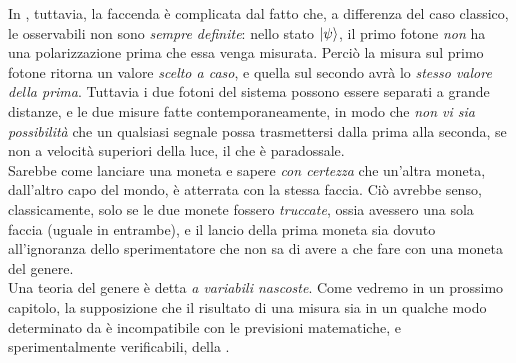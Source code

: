 \documentclass[../../FisicaTeorica.tex]{subfiles}
\begin{document}
\begin{oss}
In \MQ, tuttavia, la faccenda è complicata dal fatto che, a differenza del caso classico, le osservabili non sono \textit{sempre definite}: nello stato $\ket{\psi}$, il primo fotone \textit{non} ha una polarizzazione  prima che essa venga misurata. Perciò la misura sul primo fotone ritorna un valore \textit{scelto a caso}, e quella sul secondo avrà lo \textit{stesso valore della prima}. Tuttavia i due fotoni del sistema possono essere separati a grande distanze, e le due misure fatte contemporaneamente, in modo che \textit{non vi sia possibilità} che un qualsiasi segnale possa trasmettersi dalla prima alla seconda, se non a velocità superiori della luce, il che è paradossale.\\
Sarebbe come lanciare una moneta e sapere \textit{con certezza} che un'altra moneta, dall'altro capo del mondo, è atterrata con la stessa faccia. Ciò avrebbe senso, classicamente, solo se le due monete fossero \textit{truccate}, ossia avessero una sola faccia (uguale in entrambe), e il lancio della prima moneta sia dovuto all'ignoranza dello sperimentatore che non sa di avere a che fare con una moneta del genere.\\
Una teoria del genere è detta \textit{a variabili nascoste}. Come vedremo in un prossimo capitolo, la supposizione che il risultato di una misura sia in un qualche modo determinato da  è incompatibile con le previsioni matematiche, e sperimentalmente verificabili, della \MQ.
\end{oss}
\end{document}

